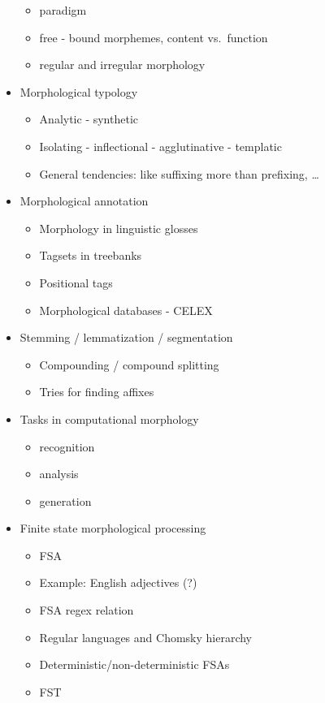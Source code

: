 \begin{itemize}
\begin{itemize}
      \item paradigm 
      \item free - bound morphemes, content vs.\ function
      \item regular and irregular morphology
    \end{itemize}
  \item Morphological typology
    \begin{itemize}
      \item Analytic - synthetic
      \item Isolating - inflectional - agglutinative - templatic
      \item General tendencies: like suffixing more than prefixing, \ldots
    \end{itemize}
  \item Morphological annotation
    \begin{itemize}
      \item Morphology in linguistic glosses
      \item Tagsets in treebanks
      \item Positional tags
      \item Morphological databases - CELEX
    \end{itemize}
  \item Stemming / lemmatization / segmentation
    \begin{itemize}
      \item Compounding / compound splitting
      \item Tries for finding affixes
    \end{itemize}
  \item Tasks in computational morphology
    \begin{itemize}
      \item recognition
      \item analysis
      \item generation
    \end{itemize}
  \item Finite state morphological processing
    \begin{itemize}
      \item FSA
      \item Example: English adjectives (?)
      \item FSA regex relation
      \item Regular languages and Chomsky hierarchy
      \item Deterministic/non-deterministic FSAs
      \item FST 

\end{itemize}
\end{itemize}
